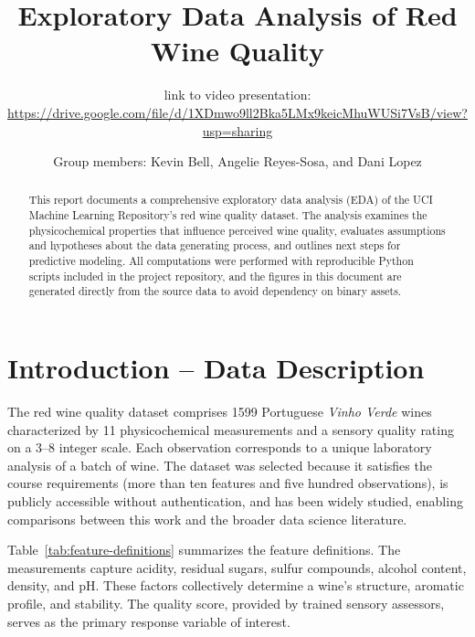 \documentclass[11pt]{article}
\title{Exploratory Data Analysis of Red Wine Quality}
\author{\vspace{-1em}\small link to video presentation: \url{https://drive.google.com/file/d/1XDmwo9ll2Bka5LMx9keicMhuWUSi7VsB/view?usp=sharing}}
\date{Group members: Kevin Bell, Angelie Reyes-Sosa, and Dani Lopez}
\begin{document}
\maketitle

\begin{abstract}
This report documents a comprehensive exploratory data analysis (EDA) of the UCI
Machine Learning Repository's red wine quality dataset. The analysis examines
the physicochemical properties that influence perceived wine quality, evaluates
assumptions and hypotheses about the data generating process, and outlines next
steps for predictive modeling. All computations were performed with reproducible
Python scripts included in the project repository, and the figures in this
document are generated directly from the source data to avoid dependency on
binary assets.
\end{abstract}

\section{Introduction -- Data Description}
The red wine quality dataset comprises \num{1599} Portuguese \emph{Vinho Verde}
wines characterized by \num{11} physicochemical measurements and a sensory
quality rating on a \numrange{3}{8} integer scale. Each observation corresponds
to a unique laboratory analysis of a batch of wine. The dataset was selected
because it satisfies the course requirements (more than ten features and five
hundred observations), is publicly accessible without authentication, and has
been widely studied, enabling comparisons between this work and the broader data
science literature.

Table~\ref{tab:feature-definitions} summarizes the feature definitions.
The measurements capture acidity, residual sugars, sulfur compounds, alcohol
content, density, and pH. These factors collectively determine a wine's
structure, aromatic profile, and stability. The quality score, provided by
trained sensory assessors, serves as the primary response variable of interest.
\end{document}
